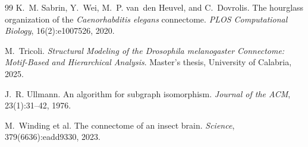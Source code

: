 \documentclass[12pt,a4paper,oneside]{article}
\theoremstyle{definition}
\theoremstyle{plain}
\begin{document}
\begin{thebibliography}{99}
K.~M. Sabrin, Y.~Wei, M.~P. van~den Heuvel, and C.~Dovrolis.
\newblock The hourglass organization of the \emph{Caenorhabditis elegans}
  connectome.
\newblock \emph{PLOS Computational Biology}, 16(2):e1007526, 2020.

M.~Tricoli.
\newblock \emph{Structural Modeling of the Drosophila melanogaster Connectome:
  Motif-Based and Hierarchical Analysis}.
\newblock Master's thesis, University of Calabria, 2025.

J.~R. Ullmann.
\newblock An algorithm for subgraph isomorphism.
\newblock \emph{Journal of the ACM}, 23(1):31--42, 1976.

M.~Winding et al.
\newblock The connectome of an insect brain.
\newblock \emph{Science}, 379(6636):eadd9330, 2023.

\end{thebibliography}
\end{document}
